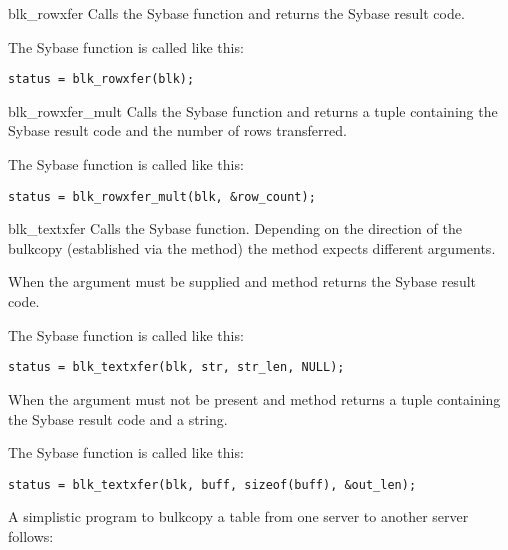 \begin{methoddesc}[CS_BLKDESC]{blk_rowxfer}{}
Calls the Sybase  function and returns the
Sybase result code.

The Sybase  function is called like this:

\begin{verbatim}
status = blk_rowxfer(blk);
\end{verbatim}
\end{methoddesc}

\begin{methoddesc}[CS_BLKDESC]{blk_rowxfer_mult}{}
Calls the Sybase  function and returns a
tuple containing the Sybase result code and the number of rows
transferred.

The Sybase  function is called like this:

\begin{verbatim}
status = blk_rowxfer_mult(blk, &row_count);
\end{verbatim}
\end{methoddesc}

\begin{methoddesc}[CS_BLKDESC]{blk_textxfer}{}
Calls the Sybase  function.  Depending on the
direction of the bulkcopy (established via the 
method) the method expects different arguments.

When   the  argument must be
supplied and method returns the Sybase result code.

The Sybase  function is called like this:

\begin{verbatim}
status = blk_textxfer(blk, str, str_len, NULL);
\end{verbatim}

When   the  argument must
not be present and method returns a tuple containing the Sybase result
code and a string.

The Sybase  function is called like this:

\begin{verbatim}
status = blk_textxfer(blk, buff, sizeof(buff), &out_len);
\end{verbatim}
\end{methoddesc}

A simplistic program to bulkcopy a table from one server to another
server follows:

